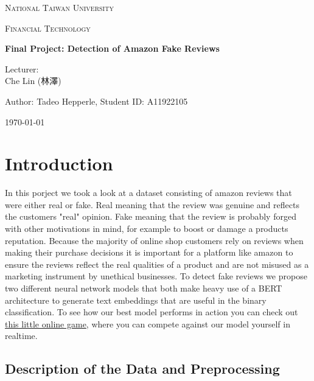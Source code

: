 \documentclass[utf8x]{ctexart}
\begin{document}
\begin{titlepage}
  \centering
  {\scshape\LARGE National Taiwan University \par}
  \vspace{1cm}
  {\scshape\Large Financial Technology \par}
  \vspace{2cm}
  {\huge\bfseries Final Project: Detection of Amazon Fake Reviews\par}
  \vspace{2cm}
  {\Large Lecturer:\\
    Che Lin (林澤) \par}
  \vspace{1cm}
  {\Large Author: Tadeo Hepperle, Student ID: A11922105 \par}
  \vfill
  {\large \today\par}
\end{titlepage}


\tableofcontents

\cleardoublepage

\section{Introduction}

In this porject we took a look at a dataset consisting of amazon reviews that were either real or fake. Real meaning that the review was genuine and reflects the customers "real" opinion. Fake meaning that the review is probably forged with other motivations in mind, for example to boost or damage a products reputation.
Because the majority of online shop customers rely on reviews when making their purchase decisions it is important for a platform like amazon to ensure the reviews reflect the real qualities of a product and are not misused as a marketing instrument by unethical businesses.
To detect fake reviews we propose two different neural network models that both make heavy use of a BERT architecture to generate text embeddings that are useful in the binary classification. To see how our best model performs in action you can check out \href{https://tadeohepperle.com/amazon-fake-reviews/}{this little online game}, where you can compete against our model yourself in realtime.

\subsection{Description of the Data and Preprocessing}
\end{document}
